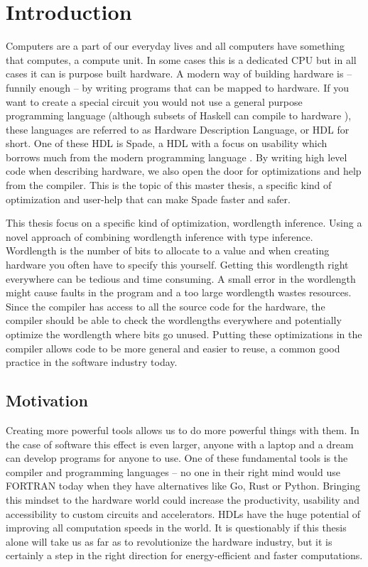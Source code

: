 \chapter{Introduction}
\label{chaIntro}
Computers are a part of our everyday lives and all computers have something that computes, a compute unit. In some cases this is a dedicated CPU but in all cases it can is purpose built hardware. A modern way of building hardware is -- funnily enough -- by writing programs that can be mapped to hardware. If you want to create a special circuit you would not use a general purpose programming language (although subsets of Haskell can compile to hardware \cite{src:ClashExists}), these languages are referred to as Hardware Description Language, or HDL for short. One of these HDL is Spade, a HDL with a focus on usability which borrows much from the modern programming language \cite{src:spadeSomething} \cite{src:spadeAnHDL}. By writing high level code when describing hardware, we also open the door for optimizations and help from the compiler. This is the topic of this master thesis, a specific kind of optimization and user-help that can make Spade faster and safer.

This thesis focus on a specific kind of optimization, wordlength inference. Using a novel approach of combining wordlength inference with type inference. Wordlength is the number of bits to allocate to a value and when creating hardware you often have to specify this yourself. Getting this wordlength right everywhere can be tedious and time consuming. A small error in the wordlength might cause faults in the program and a too large wordlength wastes resources. %
Since the compiler has access to all the source code for the hardware, the compiler should be able to check the wordlengths everywhere and potentially optimize the wordlength where bits go unused. Putting these optimizations in the compiler allows code to be more general and easier to reuse, a common good practice in the software industry today. 

\section{Motivation}
Creating more powerful tools allows us to do more powerful things with them. In the case of software this effect is even larger, anyone with a laptop and a dream can develop programs for anyone to use. One of these fundamental tools is the compiler and programming languages -- no one in their right mind would use FORTRAN today when they have alternatives like Go, Rust or Python. Bringing this mindset to the hardware world could increase the productivity, usability and accessibility to custom circuits and accelerators. HDLs have the huge potential of improving all computation speeds in the world. It is questionably if this thesis alone will take us as far as to revolutionize the hardware industry, but it is certainly a step in the right direction for energy-efficient and faster computations.

